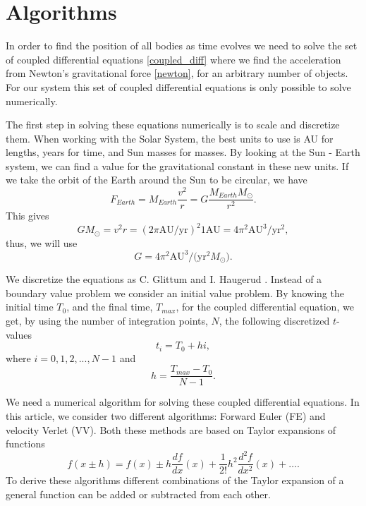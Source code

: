 \documentclass[%
 reprint,
nofootinbib,
aps,
]{revtex4-1}
\begin{document}
\section{Algorithms}
In order to find the position of all bodies as time evolves we need to solve the set of coupled differential equations \eqref{coupled_diff} where we find the acceleration from Newton's gravitational force \eqref{newton}, for an arbitrary number of objects. For our system this set of coupled differential equations is only possible to solve numerically.

The first step in solving these equations numerically is to scale and discretize them. When working with the Solar System, the best units to use is AU for lengths, years for time, and Sun masses for masses. By looking at the Sun - Earth system, we can find a value for the gravitational constant in these new units. If we take the orbit of the Earth around the Sun to be circular, we have
\begin{equation}
F_{Earth} = M_{Earth}\frac{v^2}{r} = G \frac{M_{Earth} M_\odot}{r^2}.
\end{equation}
This gives
\begin{equation}
G M_\odot = v^2r = (2\pi \mathrm{AU/yr})^2 1\mathrm{AU} = 4\pi^2 \mathrm{AU^3/yr^2},
\end{equation}
thus, we will use
\begin{equation}
G =  4\pi^2 \mathrm{AU^3/(yr^2}M_\odot ).
\end{equation}

We discretize the equations as C. Glittum and I. Haugerud \citep{project1}. Instead of a boundary value problem we consider an initial value problem. By knowing the initial time $T_0$, and the final time, $T_{max}$, for the coupled differential equation, we get, by using the number of integration points, $N$, the following discretized $t$-values
\begin{equation}
t_i = T_0+hi,
\end{equation}
where $i = 0, 1, 2, ... , N-1$ and
\begin{equation}
h = \frac{T_{max}-T_0}{N-1}.
\end{equation}


We need a numerical algorithm for solving these coupled differential equations. In this article, we consider two different algorithms: Forward Euler (FE) and velocity Verlet (VV). Both these methods are based on Taylor expansions of functions
\begin{equation}\label{eq: Taylor}
f(x \pm h) = f(x) \pm h\frac{df}{dx}(x) + \frac{1}{2!}h^2\frac{d^2f}{dx^2}(x) + \dots.
\end{equation}
To derive these algorithms different combinations of the Taylor expansion of a general function can be added or subtracted from each other.
\end{document}

